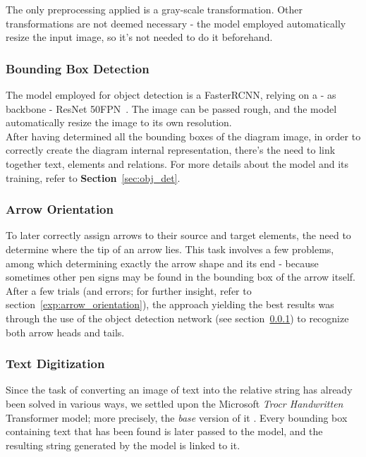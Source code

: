 \documentclass[conference]{IEEEtran}
\begin{document}
The only preprocessing applied is a gray-scale transformation. Other transformations are not deemed necessary - the model employed automatically resize the input image, so it's not needed to do it beforehand. \\

\subsubsection{Bounding Box Detection}
\label{extr:bbd}
The model employed for object detection is a FasterRCNN, relying on a - as backbone - ResNet 50FPN~\cite{rcnn}. The image can be passed rough, and the model automatically resize the image to its own resolution. \\ 
After having determined all the bounding boxes of the diagram image, in order to correctly create the diagram internal representation, there's the need to link together text, elements and relations. For more details about the model and its training, refer to \textbf{Section}~\ref{sec:obj_det}. \\


\subsubsection{Arrow Orientation}
To later correctly assign arrows to their source and target elements, the need to determine where the tip of an arrow lies. This task involves a few problems, among which determining exactly the arrow shape and its end - because sometimes other pen signs may be found in the bounding box of the arrow itself. After a few trials (and errors; for further insight, refer to section~\ref{exp:arrow_orientation}), the approach yielding the best results was through the use of the object detection network (see section~\ref{extr:bbd}) to recognize both arrow heads and tails. \\

\subsubsection{Text Digitization}
Since the task of converting an image of text into the relative string has already been solved in various ways, we settled upon the Microsoft \textit{Trocr Handwritten} Transformer model; more precisely, the \textit{base} version of it \cite{microsofttrocr}. Every bounding box containing text that has been found is later passed to the model, and the resulting string generated by the model is linked to it.\\
\end{document}
